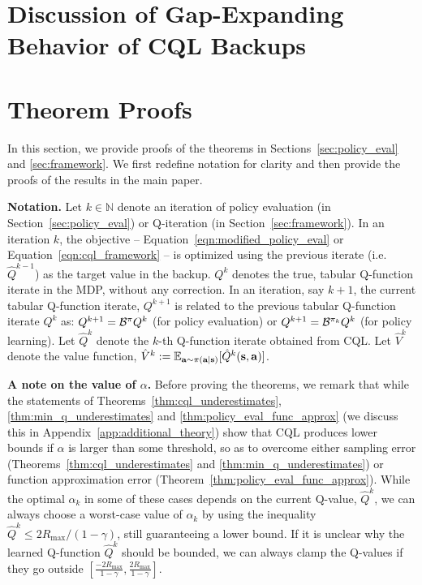 \section{Discussion of Gap-Expanding Behavior of CQL Backups}
\label{app:gap_amplify}


\section{Theorem Proofs}
\label{app:missing_proofs}
In this section, we provide proofs of the theorems in Sections~\ref{sec:policy_eval} and \ref{sec:framework}. We first redefine notation for clarity and then provide the proofs of the results in the main paper.

\textbf{Notation.} Let $k \in \mathbb{N}$ denote an iteration of policy evaluation (in Section~\ref{sec:policy_eval}) or Q-iteration (in Section~\ref{sec:framework}). In an iteration $k$, the objective -- Equation~\ref{eqn:modified_policy_eval} or Equation~\ref{eqn:cql_framework} -- is optimized using the previous iterate (i.e. $\hat{Q}^{k-1}$) as the target value in the backup. $Q^k$ denotes the true, tabular Q-function iterate in the MDP, without any correction. In an iteration, say $k+1$, the current tabular Q-function iterate, $Q^{k+1}$ is related to the previous tabular Q-function iterate ${Q}^k$ as: $Q^{k+1} = \mathcal{B}^{\pi} Q^k$ (for policy evaluation) or $Q^{k+1} = \mathcal{B}^{\pi_k} Q^k$ (for policy learning). Let $\hat{Q}^k$ denote the $k$-th Q-function iterate obtained from CQL. Let $\hat{V}^k$ denote the value function, $\hat{V}^k := \mathbb{E}_{\mathbf{a} \sim \pi(\mathbf{a}|\mathbf{s})}[\hat{Q}^k(\mathbf{s}, \mathbf{a})]$.   

\textbf{A note on the value of $\alpha$.} Before proving the theorems, we remark that while the statements of Theorems~\ref{thm:cql_underestimates}, \ref{thm:min_q_underestimates} and \ref{thm:policy_eval_func_approx} (we discuss this in Appendix~\ref{app:additional_theory}) show that CQL produces lower bounds if $\alpha$ is larger than some threshold, so as to overcome either sampling error (Theorems~\ref{thm:cql_underestimates} and \ref{thm:min_q_underestimates}) or function approximation error (Theorem~\ref{thm:policy_eval_func_approx}). While the optimal $\alpha_k$ in some of these cases depends on the current Q-value, $\hat{Q}^k$, we can always choose a worst-case value of $\alpha_k$ by using the inequality $\hat{Q}^k \leq 2 R_{\max}/(1 - \gamma)$, still guaranteeing a lower bound. If it is unclear why the learned Q-function $\hat{Q}^k$ should be bounded, we can always clamp the Q-values if they go outside $\left[ \frac{-2 R_{\max}}{1 - \gamma}, \frac{2 R_{\max}}{1 - \gamma} \right]$.

